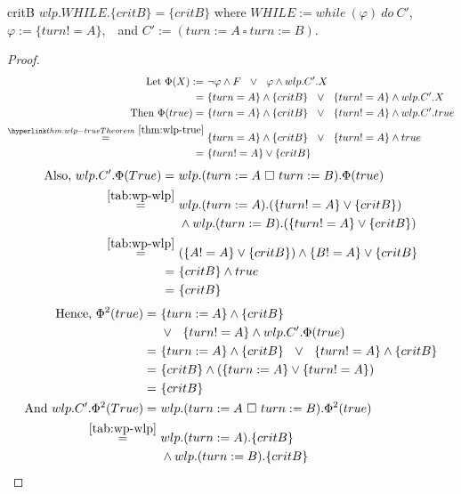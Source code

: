 \begin{lemma}{critB}
	$wlp.WHILE.\{critB\} = \{critB\}$
	where $WHILE := while\ (\varphi)\ do\ C'$, $\varphi := \{turn!=A\}$,\ \ and $C':=(turn:=A\ \square\ turn:=B)$. 
\end{lemma}
\begin{proof} 
	\begin{align*}
		\text{Let }\Phi(X) :=&\ \neg\varphi\wedge F\ \ \vee\ \ \varphi\wedge wlp.C'.X\\ 
		=&\ \{turn=A\}\wedge \{critB\}\ \ \vee\ \ \{turn!=A\} \wedge wlp.C'.X\\
		\text{Then }\Phi(true) =&\ \{turn=A\}\wedge \{critB\}\ \ \vee\ \ \{turn!=A\} \wedge wlp.C'.true \\ 
		\overset{\thm{wlp-true}}{=}&\ \{turn=A\}\wedge \{critB\}\ \ \vee\ \ \{turn!=A\} \wedge true \\
		=&\ \{turn != A\} \vee \{critB\} \\
	\end{align*}
	\begin{align*}
		\text{Also, } wlp.C'.\Phi(True)=&\ wlp.(turn:=A\ \square\ turn:=B).\Phi(true)\\
		\overset{\autoref{tab:wp-wlp}}{=}&\ wlp.(turn:=A).(\{turn != A\} \vee \{critB\}) \\
		&\ \wedge wlp.(turn:=B).(\{turn != A\} \vee \{critB\})\\
		\overset{\autoref{tab:wp-wlp}}{=}&\ (\{A!=A\}\vee\{critB\})\wedge\{B!=A\}\vee\{critB\}\\
		=&\ \{critB\}\wedge true \\
		=&\ \{critB\}
	\end{align*}
	\begin{align*}
		\text{Hence, }\Phi^2(true) =&\ \{turn:=A\}\wedge \{critB\}\\
		&\ \vee\ \ \{turn!=A\} \wedge wlp.C'.\Phi(true) \\
		=&\ \{turn:=A\}\wedge \{critB\}\ \ \vee\ \ \{turn!=A\} \wedge \{critB\}\\
		=&\ \{critB\} \wedge (\{turn:=A\} \vee \{turn!=A\})\\
		=&\ \{critB\}\\
		\text{And } wlp.C'.\Phi^2(True)=&\ wlp.(turn:=A\ \square\ turn:=B).\Phi^2(true)\\
		\overset{\autoref{tab:wp-wlp}}{=}&\ wlp.(turn:=A).\{critB\} \\
		&\ \wedge wlp.(turn:=B).\{critB\}\\

\end{align*}
\end{proof}
